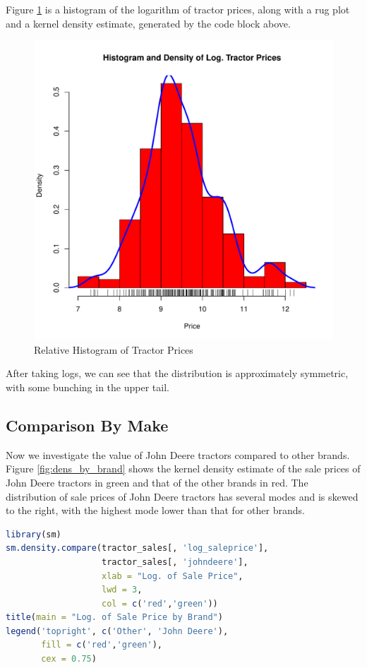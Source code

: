 \documentclass[11pt]{book}
\begin{document}
Figure \ref{fig:hist_dens_log_price} is
a histogram of the logarithm of tractor prices,
along with a rug plot and a kernel density estimate,
generated by the code block above.
%
\begin{figure}[h!]
  \centering
  \includegraphics[scale = 0.5, keepaspectratio=true]{../Figures/hist_dens_log_price}
  \caption{Relative Histogram of Tractor Prices} \label{fig:hist_dens_log_price}
\end{figure}
%
After taking logs, we can see that the distribution is
approximately symmetric, with some bunching in the
upper tail.

\pagebreak
\subsection{Comparison By Make}

Now we investigate the value of John Deere tractors
compared to other brands.
Figure \ref{fig:dens_by_brand} shows the
kernel density estimate of the sale prices of John Deere tractors
in green and that of the other brands in red.
%
The distribution of sale prices of John Deere tractors has several modes and is skewed to the right,
with the highest mode lower than that for other brands.


\begin{lstlisting}[language=R]
library(sm)
sm.density.compare(tractor_sales[, 'log_saleprice'],
                   tractor_sales[, 'johndeere'],
                   xlab = "Log. of Sale Price",
                   lwd = 3,
                   col = c('red','green'))
title(main = "Log. of Sale Price by Brand")
legend('topright', c('Other', 'John Deere'),
       fill = c('red','green'),
       cex = 0.75)
\end{lstlisting}
\end{document}
